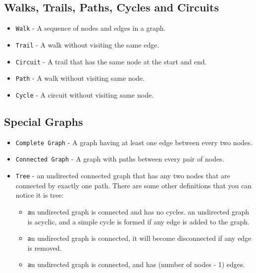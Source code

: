 \documentclass[12pt]{article}
\begin{document}
    \subsection{Walks, Trails, Paths, Cycles and Circuits}
        \begin{itemize}
          \item \texttt{Walk} - A sequence of nodes and edges in a graph.
          
          \item \texttt{Trail} - A walk without visiting the same edge.
          
          \item \texttt{Circuit} - A trail that has the same node at the start and end.
          
          \item \texttt{Path} - A walk without visiting same node.
          
          \item \texttt{Cycle} - A circuit without visiting same node. 
          
        \end{itemize}
    \subsection{Special Graphs}
        \begin{itemize}
         \item \texttt{Complete Graph} -  A graph having at least one edge between every two nodes.
         \item \texttt{Connected Graph} -  A graph with paths between every pair of nodes. 
         \item \texttt{Tree} - an undirected connected graph that has any two nodes that are connected by exactly one path.
         There are some other definitions that you can notice it is tree:
             \begin{itemize}
             \item \texttt an undirected graph is connected and has no cycles.
             an undirected graph is acyclic, and a simple cycle is formed if any edge is added to the graph.
             \item \texttt an undirected graph is connected, it will become disconnected if any edge is removed.
             \item \texttt an undirected graph is connected, and has  (number of nodes - 1) edges.
             \end{itemize}
        \end{itemize}
\end{document}
